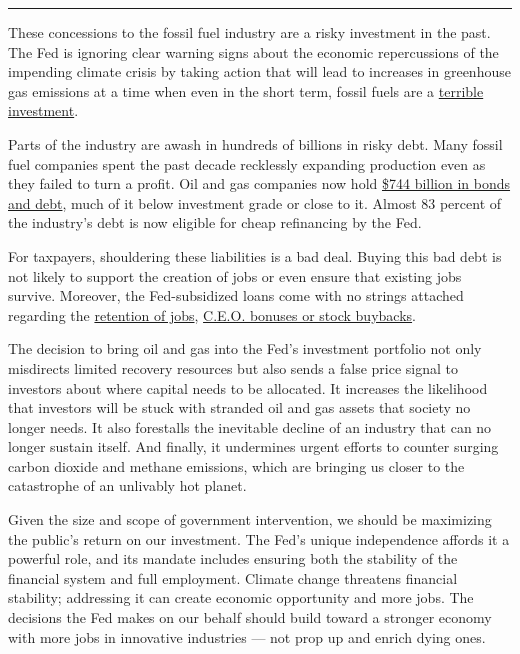 \begin{center}\rule{0.5\linewidth}{\linethickness}\end{center}

These concessions to the fossil fuel industry are a risky investment in
the past. The Fed is ignoring clear warning signs about the economic
repercussions of the impending climate crisis by taking action that will
lead to increases in greenhouse gas emissions at a time when even in the
short term, fossil fuels are a
\href{https://www.eenews.net/stories/1063050681}{terrible}
\href{https://www.cnbc.com/2020/01/31/cramer-sees-oil-stocks-in-the-death-knell-phase-says-new-tobacco.html}{investment}.

Parts of the industry are awash in hundreds of billions in risky debt.
Many fossil fuel companies spent the past decade recklessly expanding
production even as they failed to turn a profit. Oil and gas companies
now hold
\href{https://ieefa.org/ieefa-commentary-federal-lending-to-the-oil-and-gas-sector-would-be-a-complete-waste-of-money/}{\$744
billion in bonds and debt}, much of it below investment grade or close
to it. Almost 83 percent of the industry's debt is now eligible for
cheap refinancing by the Fed.

For taxpayers, shouldering these liabilities is a bad deal. Buying this
bad debt is not likely to support the creation of jobs or even ensure
that existing jobs survive. Moreover, the Fed-subsidized loans come with
no strings attached regarding the
\href{https://www.bloomberg.com/news/articles/2020-05-01/fed-rebuked-over-loan-terms-that-don-t-explicitly-bar-layoffs}{retention
of jobs},
\href{https://www.washingtonpost.com/business/2020/04/28/federal-reserve-bond-corporations/}{C.E.O.
bonuses or stock buybacks}.

The decision to bring oil and gas into the Fed's investment portfolio
not only misdirects limited recovery resources but also sends a false
price signal to investors about where capital needs to be allocated. It
increases the likelihood that investors will be stuck with stranded oil
and gas assets that society no longer needs. It also forestalls the
inevitable decline of an industry that can no longer sustain itself. And
finally, it undermines urgent efforts to counter surging carbon dioxide
and methane emissions, which are bringing us closer to the catastrophe
of an unlivably hot planet.

Given the size and scope of government intervention, we should be
maximizing the public's return on our investment. The Fed's unique
independence affords it a powerful role, and its mandate includes
ensuring both the stability of the financial system and full employment.
Climate change threatens financial stability; addressing it can create
economic opportunity and more jobs. The decisions the Fed makes on our
behalf should build toward a stronger economy with more jobs in
innovative industries --- not prop up and enrich dying ones.

